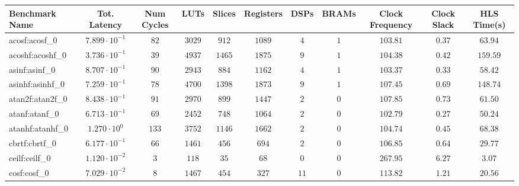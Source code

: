 \begin{tabular}{|l|c|c|c|c|c|c|c|c|c|c|}
\hline
Benchmark Name               & Tot. Latency            & Num Cycles & LUTs      & Slices    & Registers & DSPs    & BRAMs & Clock Frequency & Clock Slack & HLS Time(s) \\
\hline
acosf:acosf\_0               & $ 7.899 \cdot 10^{-1} $ & $ 82     $ & $ 3029  $ & $ 912   $ & $ 1089  $ & $ 4   $ & $ 1 $ & $ 103.81      $ & $ 0.37    $ & $ 63.94   $ \\
acoshf:acoshf\_0             & $ 3.736 \cdot 10^{-1} $ & $ 39     $ & $ 4937  $ & $ 1465  $ & $ 1875  $ & $ 9   $ & $ 1 $ & $ 104.38      $ & $ 0.42    $ & $ 159.59  $ \\
asinf:asinf\_0               & $ 8.707 \cdot 10^{-1} $ & $ 90     $ & $ 2943  $ & $ 884   $ & $ 1162  $ & $ 4   $ & $ 1 $ & $ 103.37      $ & $ 0.33    $ & $ 58.42   $ \\
asinhf:asinhf\_0             & $ 7.259 \cdot 10^{-1} $ & $ 78     $ & $ 4700  $ & $ 1398  $ & $ 1873  $ & $ 9   $ & $ 1 $ & $ 107.45      $ & $ 0.69    $ & $ 148.74  $ \\
atan2f:atan2f\_0             & $ 8.438 \cdot 10^{-1} $ & $ 91     $ & $ 2970  $ & $ 899   $ & $ 1447  $ & $ 2   $ & $ 0 $ & $ 107.85      $ & $ 0.73    $ & $ 61.50   $ \\
atanf:atanf\_0               & $ 6.713 \cdot 10^{-1} $ & $ 69     $ & $ 2452  $ & $ 748   $ & $ 1064  $ & $ 2   $ & $ 0 $ & $ 102.79      $ & $ 0.27    $ & $ 50.24   $ \\
atanhf:atanhf\_0             & $ 1.270 \cdot 10^{0}  $ & $ 133    $ & $ 3752  $ & $ 1146  $ & $ 1662  $ & $ 2   $ & $ 0 $ & $ 104.74      $ & $ 0.45    $ & $ 68.38   $ \\
cbrtf:cbrtf\_0               & $ 6.177 \cdot 10^{-1} $ & $ 66     $ & $ 1461  $ & $ 456   $ & $ 694   $ & $ 2   $ & $ 0 $ & $ 106.85      $ & $ 0.64    $ & $ 29.77   $ \\
ceilf:ceilf\_0               & $ 1.120 \cdot 10^{-2} $ & $ 3      $ & $ 118   $ & $ 35    $ & $ 68    $ & $ 0   $ & $ 0 $ & $ 267.95      $ & $ 6.27    $ & $ 3.07    $ \\
cosf:cosf\_0                 & $ 7.029 \cdot 10^{-2} $ & $ 8      $ & $ 1467  $ & $ 454   $ & $ 327   $ & $ 11  $ & $ 0 $ & $ 113.82      $ & $ 1.21    $ & $ 20.56   $ \\

\end{tabular}

